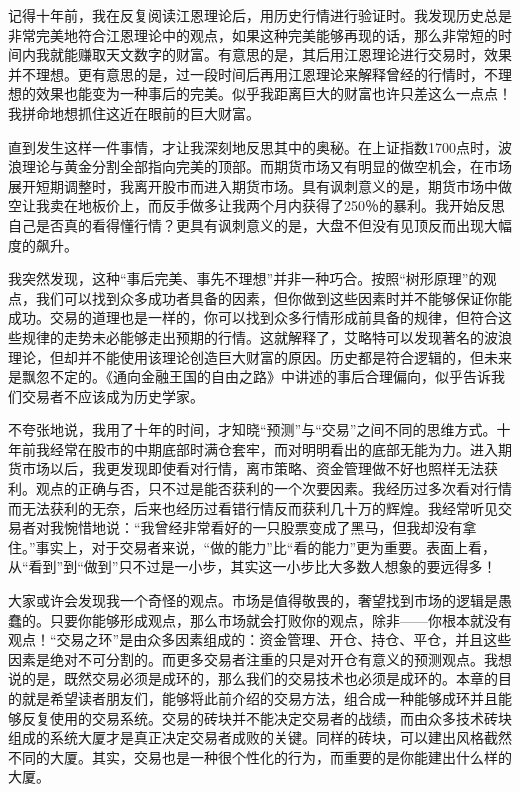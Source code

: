 记得十年前，我在反复阅读江恩理论后，用历史行情进行验证时。我发现历史总是非常完美地符合江恩理论中的观点，如果这种完美能够再现的话，那么非常短的时间内我就能赚取天文数字的财富。有意思的是，其后用江恩理论进行交易时，效果并不理想。更有意思的是，过一段时间后再用江恩理论来解释曾经的行情时，不理想的效果也能变为一种事后的完美。似乎我距离巨大的财富也许只差这么一点点！我拼命地想抓住这近在眼前的巨大财富。

直到发生这样一件事情，才让我深刻地反思其中的奥秘。在上证指数1700点时，波浪理论与黄金分割全部指向完美的顶部。而期货市场又有明显的做空机会，在市场展开短期调整时，我离开股市而进入期货市场。具有讽刺意义的是，期货市场中做空让我卖在地板价上，而反手做多让我两个月内获得了250％的暴利。我开始反思自己是否真的看得懂行情？更具有讽刺意义的是，大盘不但没有见顶反而出现大幅度的飙升。

我突然发现，这种“事后完美、事先不理想”并非一种巧合。按照“树形原理”的观点，我们可以找到众多成功者具备的因素，但你做到这些因素时并不能够保证你能成功。交易的道理也是一样的，你可以找到众多行情形成前具备的规律，但符合这些规律的走势未必能够走出预期的行情。这就解释了，艾略特可以发现著名的波浪理论，但却并不能使用该理论创造巨大财富的原因。历史都是符合逻辑的，但未来是飘忽不定的。《通向金融王国的自由之路》中讲述的事后合理偏向，似乎告诉我们交易者不应该成为历史学家。

不夸张地说，我用了十年的时间，才知晓“预测”与“交易”之间不同的思维方式。十年前我经常在股市的中期底部时满仓套牢，而对明明看出的底部无能为力。进入期货市场以后，我更发现即使看对行情，离市策略、资金管理做不好也照样无法获利。观点的正确与否，只不过是能否获利的一个次要因素。我经历过多次看对行情而无法获利的无奈，后来也经历过看错行情反而获利几十万的辉煌。我经常听见交易者对我惋惜地说：“我曾经非常看好的一只股票变成了黑马，但我却没有拿住。”事实上，对于交易者来说，“做的能力”比“看的能力”更为重要。表面上看，从“看到”到“做到”只不过是一小步，其实这一小步比大多数人想象的要远得多！

大家或许会发现我一个奇怪的观点。市场是值得敬畏的，奢望找到市场的逻辑是愚蠢的。只要你能够形成观点，那么市场就会打败你的观点，除非——你根本就没有观点！“交易之环”是由众多因素组成的：资金管理、开仓、持仓、平仓，并且这些因素是绝对不可分割的。而更多交易者注重的只是对开仓有意义的预测观点。我想说的是，既然交易必须是成环的，那么我们的交易技术也必须是成环的。本章的目的就是希望读者朋友们，能够将此前介绍的交易方法，组合成一种能够成环并且能够反复使用的交易系统。交易的砖块并不能决定交易者的战绩，而由众多技术砖块组成的系统大厦才是真正决定交易者成败的关键。同样的砖块，可以建出风格截然不同的大厦。其实，交易也是一种很个性化的行为，而重要的是你能建出什么样的大厦。

